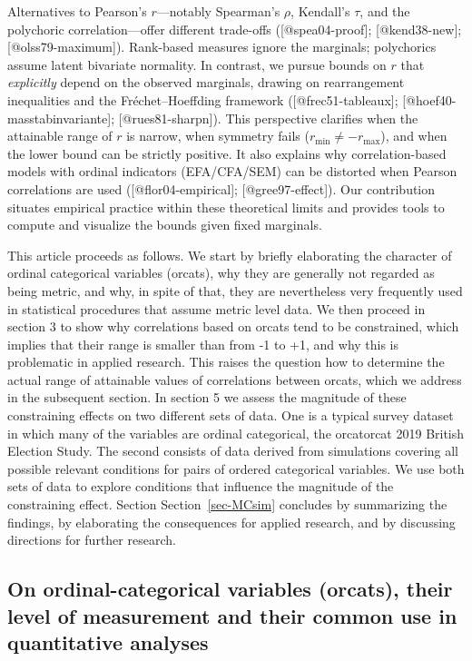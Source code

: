 \documentclass[
  12pt,
]{article}
\theoremstyle{plain}
\theoremstyle{definition}
\theoremstyle{remark}
\begin{document}
Alternatives to Pearson’s \(r\)—notably Spearman’s \(\rho\), Kendall’s \(\tau\), and the polychoric correlation—offer different trade-offs ([@spea04-proof]; [@kend38-new]; [@olss79-maximum]). Rank-based measures ignore the marginals; polychorics assume latent bivariate normality. In contrast, we pursue bounds on \(r\) that \emph{explicitly} depend on the observed marginals, drawing on rearrangement inequalities and the Fréchet–Hoeffding framework ([@frec51-tableaux]; [@hoef40-masstabinvariante]; [@rues81-sharpn]). This perspective clarifies when the attainable range of \(r\) is narrow, when symmetry fails (\(r_{\min}\neq -r_{\max}\)), and when the lower bound can be strictly positive. It also explains why correlation-based models with ordinal indicators (EFA/CFA/SEM) can be distorted when Pearson correlations are used ([@flor04-empirical]; [@gree97-effect]). Our contribution situates empirical practice within these theoretical limits and provides tools to compute and visualize the bounds given fixed marginals.

This article proceeds as follows. We start by briefly elaborating the
character of ordinal categorical variables (orcats), why they are
generally not regarded as being metric, and why, in spite of that, they
are nevertheless very frequently used in statistical procedures that
assume metric level data. We then proceed in section 3 to show why
correlations based on orcats tend to be constrained, which implies that
their range is smaller than from -1 to +1, and why this is problematic
in applied research. This raises the question how to determine the
actual range of attainable values of correlations between orcats, which
we address in the subsequent section. In section 5 we assess the
magnitude of these constraining effects on two different sets of data.
One is a typical survey dataset in which many of the variables are
ordinal categorical, the orcatorcat 2019 British Election Study. The
second consists of data derived from simulations covering all possible
relevant conditions for pairs of ordered categorical variables. We use
both sets of data to explore conditions that influence the magnitude of
the constraining effect. Section Section~\ref{sec-MCsim} concludes by
summarizing the findings, by elaborating the consequences for applied
research, and by discussing directions for further research.

\subsection{On ordinal-categorical variables (orcats), their level of
measurement and their common use in quantitative
analyses}\label{on-ordinal-categorical-variables-orcats-their-level-of-measurement-and-their-common-use-in-quantitative-analyses}
\end{document}
